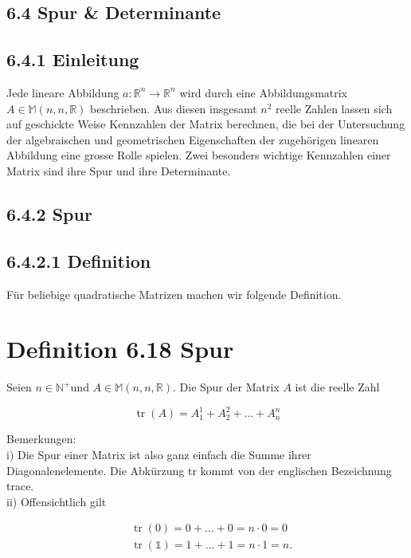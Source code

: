 \documentclass[10pt]{article}
\begin{document}
\subsection*{6.4 Spur \& Determinante}
\subsection*{6.4.1 Einleitung}
Jede lineare Abbildung $a: \mathbb{R}^{n} \rightarrow \mathbb{R}^{n}$ wird durch eine Abbildungsmatrix $A \in \mathbb{M}(n, n, \mathbb{R})$ beschrieben. Aus diesen insgesamt $n^{2}$ reelle Zahlen lassen sich auf geschickte Weise Kennzahlen der Matrix berechnen, die bei der Untersuchung der algebraischen und geometrischen Eigenschaften der zugehörigen linearen Abbildung eine grosse Rolle spielen. Zwei besonders wichtige Kennzahlen einer Matrix sind ihre Spur und ihre Determinante.

\subsection*{6.4.2 Spur}
\subsection*{6.4.2.1 Definition}
Für beliebige quadratische Matrizen machen wir folgende Definition.

\section*{Definition 6.18 Spur}
Seien $n \in \mathbb{N}^{+}$und $A \in \mathbb{M}(n, n, \mathbb{R})$. Die Spur der Matrix $A$ ist die reelle Zahl


\begin{equation*}
\operatorname{tr}(A)=A_{1}^{1}+A_{2}^{2}+\ldots+A_{n}^{n} \tag{6.89}
\end{equation*}


Bemerkungen:\\
i) Die Spur einer Matrix ist also ganz einfach die Summe ihrer Diagonalenelemente. Die Abkürzung tr kommt von der englischen Bezeichnung trace.\\
ii) Offensichtlich gilt


\begin{align*}
& \operatorname{tr}(0)=0+\ldots+0=n \cdot 0=0  \tag{6.90}\\
& \operatorname{tr}(\mathbb{1})=1+\ldots+1=n \cdot 1=n . \tag{6.91}
\end{align*}
\end{document}
